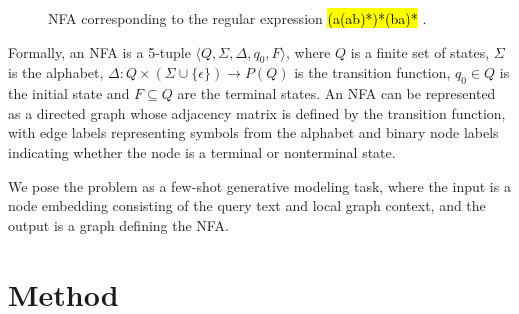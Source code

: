 \documentclass{article}
\newcommand{\tinline}[1]{%
    \begingroup%
    \sethlcolor{slightgray}%
    \hl{\ttfamily\footnotesize #1}%
    \endgroup
}
\begin{document}
\begin{figure}
    \caption{NFA corresponding to the regular expression \tinline{(a(ab)*)*(ba)*}.}
    \label{fig:regex_to_nfa}
\end{figure}

Formally, an NFA is a 5-tuple $\langle Q, \Sigma, \Delta, q_0, F \rangle$, where $Q$ is a finite set of states, $\Sigma$ is the alphabet, $\Delta :Q\times (\Sigma \cup \{\epsilon \})\rightarrow P(Q)$ is the transition function, $q_0 \in Q$ is the initial state and $F \subseteq Q$ are the terminal states. An NFA can be represented as a directed graph whose adjacency matrix is defined by the transition function, with edge labels representing symbols from the alphabet and binary node labels indicating whether the node is a terminal or nonterminal state.

We pose the problem as a few-shot generative modeling task, where the input is a node embedding consisting of the query text and local graph context, and the output is a graph defining the NFA.

\section{Method}
\end{document}

